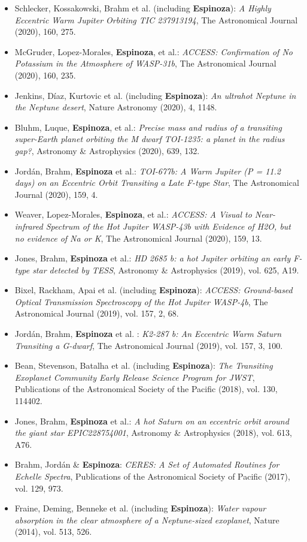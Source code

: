 \documentclass[12pt, a4paper]{article} %
\begin{document}
\begin{flushleft}
\begin{itemize}
\item Schlecker, Kossakowski, Brahm et al. (including \textbf{Espinoza}): \textit{A Highly Eccentric Warm Jupiter Orbiting TIC 237913194}, The Astronomical Journal (2020), 160, 275.
\item McGruder, Lopez-Morales, \textbf{Espinoza}, et al.: \textit{ACCESS: Confirmation of No Potassium in the Atmosphere of WASP-31b}, The Astronomical Journal (2020), 160, 235. 
\item Jenkins, D\'iaz, Kurtovic et al. (including \textbf{Espinoza}): \textit{An ultrahot Neptune in the Neptune desert}, Nature Astronomy (2020), 4, 1148.
\item Bluhm, Luque, \textbf{Espinoza}, et al.: \textit{Precise mass and radius of a transiting super-Earth planet orbiting the M dwarf TOI-1235: a planet in the radius gap?}, Astronomy \& Astrophysics (2020), 639, 132. 
\item Jord\'an, Brahm, \textbf{Espinoza} et al.: \textit{TOI-677b: A Warm Jupiter (P = 11.2 days) on an Eccentric Orbit Transiting a Late F-type Star}, The Astronomical Journal (2020), 159, 4. 
\item Weaver, Lopez-Morales, \textbf{Espinoza}, et al.: \textit{ACCESS: A Visual to Near-infrared Spectrum of the Hot Jupiter WASP-43b with Evidence of H2O, but no evidence of Na or K}, The Astronomical Journal (2020), 159, 13. 
\item Jones, Brahm, \textbf{Espinoza} et al.: \textit{HD 2685 b: a hot Jupiter orbiting an early F-type star detected by TESS}, Astronomy \& Astrophysics (2019), vol. 625, A19.
\item Bixel, Rackham, Apai et al. (including \textbf{Espinoza}): \textit{ACCESS: Ground-based Optical Transmission Spectroscopy of the Hot Jupiter WASP-4b}, The Astronomical Journal (2019), vol. 157, 2, 68.
\item Jord\'an, Brahm, \textbf{Espinoza} et al. : \textit{K2-287 b: An Eccentric Warm Saturn Transiting a G-dwarf}, The Astronomical Journal (2019), vol. 157, 3, 100.
\item Bean, Stevenson, Batalha et al. (including \textbf{Espinoza}): \textit{The Transiting Exoplanet Community Early Release Science Program for JWST}, Publications of the Astronomical Society of the Pacific (2018), vol. 130, 114402.
\item Jones, Brahm, \textbf{Espinoza} et al.: \textit{A hot Saturn on an eccentric orbit around the giant star EPIC228754001},  Astronomy \& Astrophysics (2018), vol. 613, A76.
\item Brahm, Jord\'an \& \textbf{Espinoza}: \textit{CERES: A Set of Automated Routines for Echelle Spectra}, Publications of the 
Astronomical Society of Pacific (2017), vol. 129, 973.
\item Fraine, Deming, Benneke et al. (including \textbf{Espinoza}): \textit{Water vapour absorption in the clear atmosphere of a Neptune-sized exoplanet}, Nature (2014), vol. 513, 526.
\end{itemize}
\end{flushleft}
\end{document}
